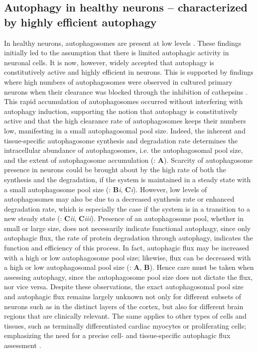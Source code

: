 \subsection{Autophagy in healthy neurons – characterized by highly efficient autophagy}
In healthy neurons, autophagosomes are present at low levels \citep{Boland2008,Mizushima2004a,Nixon2005}. These findings initially led to the assumption that there is limited autophagic activity in neuronal cells. It is now, however, widely accepted that autophagy is constitutively active and highly efficient in neurons. This is supported by findings where high numbers of autophagosomes were observed in cultured primary neurons when their clearance was blocked through the inhibition of cathepsins \citep{Boland2008}. This rapid accumulation of autophagosomes occurred without interfering with autophagy induction, supporting the notion that autophagy is constitutively active and that the high clearance rate of autophagosomes keeps their numbers low, manifesting in a small autophagosomal pool size. Indeed, the inherent and tissue-specific \citep{Mizushima2004a} autophagosome synthesis and degradation rate determines the intracellular abundance of autophagosomes, i.e. the autophagosomal pool size, and the extent of autophagosome accumulation (: \textbf{A}). Scarcity of autophagosome presence in neurons could be brought about by the high rate of both the synthesis and the degradation, if the system is maintained in a steady state with a small autophagosome pool size (: \textbf{B}\textit{i}, \textbf{C}\textit{i}). However, low levels of autophagosomes may also be due to a decreased synthesis rate or enhanced degradation rate, which is especially the case if the system is in a transition to a new steady state (: \textbf{C}\textit{ii}, \textbf{C}\textit{iii}). Presence of an autophagosome pool, whether in small or large size, does not necessarily indicate functional autophagy, since only autophagic flux, the rate of protein degradation through autophagy, indicates the function and efficiency of this process. In fact, autophagic flux may be increased with a high or low autophagosome pool size; likewise, flux can be decreased with a high or low autophagosomal pool size \citep{loos2014} (: \textbf{A}, \textbf{B}). Hence care must be taken when assessing autophagy, since the autophagosome pool size does not dictate the flux, nor vice versa. Despite these observations, the exact autophagosomal pool size and autophagic flux remains largely unknown not only for different subsets of neurons such as in the distinct layers of the cortex, but also for different brain regions that are clinically relevant. The same applies to other types of cells and tissues, such as terminally differentiated cardiac myocytes or proliferating cells; emphasizing the need for a precise cell- and tissue-specific autophagic flux assessment \citep{Kaizuka2016}.

